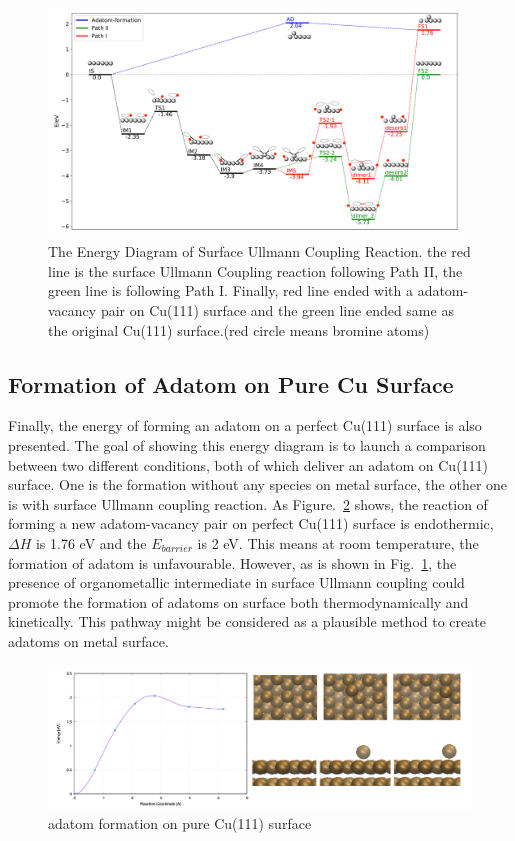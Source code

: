 \documentclass[%
 reprint,
 amsmath,amssymb,
 aps,
prb,
]{revtex4-2}
\begin{document}
\begin{figure}[hbt]
\centering
\includegraphics[width=0.98\textwidth]{Fig/completeenergy.png}
\caption{The Energy Diagram of Surface Ullmann Coupling Reaction.
the red line is the surface Ullmann Coupling reaction following Path II, the green line is following Path I. Finally, red line ended with a adatom-vacancy pair on Cu(111) surface and the green line ended same as the original Cu(111) surface.(red circle means bromine atoms)}
\label{fig:completeenergy}
\end{figure}

\subsection{Formation of Adatom on Pure Cu Surface}

Finally, the energy of forming an adatom on a perfect Cu(111) surface is also presented. The goal of showing this energy diagram is to launch a comparison between two different conditions, both of which deliver an adatom on Cu(111) surface. One is the formation without any species on metal surface, the other one is with surface Ullmann coupling reaction.
As Figure.~\ref{fig:pureadatomform} shows, the reaction of forming a new adatom-vacancy pair on perfect Cu(111) surface is endothermic, $\Delta H$ is 1.76 eV and the $E_{barrier}$ is 2 eV. This means at room temperature, the formation of adatom is unfavourable. 
However, as is shown in Fig.~\ref{fig:completeenergy}, the presence of organometallic intermediate in surface Ullmann coupling could promote the formation of adatoms on surface both thermodynamically and kinetically. This pathway might be considered as a plausible method to create adatoms on metal surface.

\begin{figure}[hbt]
\centering
\includegraphics[width=1.0\textwidth]{Fig/pureadatomform.png}
\caption{adatom formation on pure Cu(111) surface}
\label{fig:pureadatomform}
\end{figure}
\end{document}
